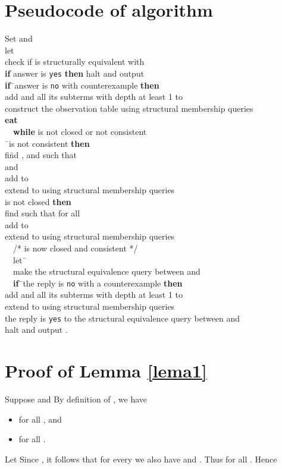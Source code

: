 \documentclass[preprint,12pt,english]{article}
\begin{document}
\section{Pseudocode of algorithm }
\label{LA}
\begin{tabbing}
Set  and \\
let \\
check if  is structurally equivalent with \\
{\bf if} answer is {\tt yes} {\bf then} halt and output \\
{\bf if}\=\ answer is {\tt no} with counterexample  {\bf then}\\
\>add  and all its subterms with depth at least 1 to \\
\>construct the observation table  using structural membership queries\\
\={\bf{eat}}\\
\>\ \ {\bf while}  is not closed or not consistent\\
\>\=\  is not consistent {\bf then}\\
\>\>\>fi\=nd , and  such that\\
\>\>\>\> and \\
\>\>\>add  to \\
\>\>\>extend  to  using structural membership queries\\
\>  is not closed {\bf then}\\
\>\>\>find  such that  for all \\
\>\>\>add  to \\
\>\>\>extend  to  using structural membership queries\\
\>\ \ /*  is now closed and consistent */ \\
\>\ \ let\=\ \\
\>\ \ make the structural equivalence query between  and \\
\>\ \ {\bf if}\=\ the reply is {\tt no} with a counterexample  {\bf then}\\
\>\>add  and all its subterms with depth at least 1 to \\
\>\>extend  to  using structural membership queries\\
 the reply is {\tt yes} to the structural equivalence query between  and \\
\>halt and output .
\end{tabbing}

\section{Proof of Lemma \ref{lema1}}
Suppose   and  By definition of , we have 
\begin{itemize}
\item[]  for all , and
\item[]  for all .
\end{itemize}
Let  Since , it follows that for every  we also have  and . Thus  for all . Hence 
\end{document}
